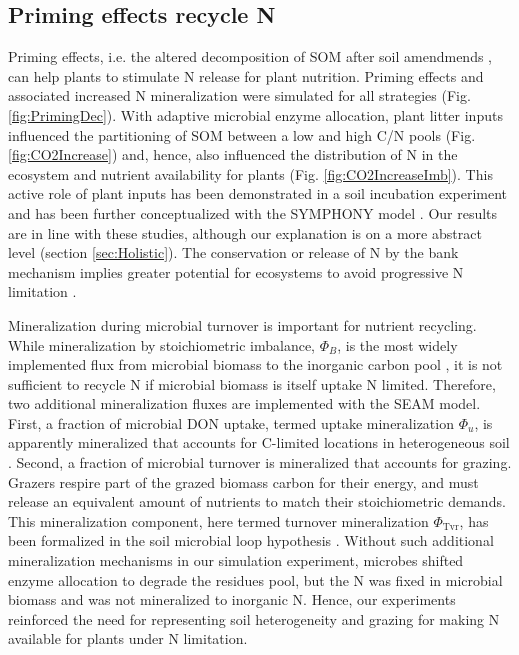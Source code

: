 \subsection{Priming effects recycle N}
Priming effects, i.e. the altered decomposition of SOM after soil amendmends
\citep{Kuzyakov00}, can help plants to stimulate N release for plant nutrition.
Priming effects and associated increased N mineralization were simulated for all
strategies (Fig. \ref{fig:PrimingDec}). With adaptive microbial enzyme
allocation, plant litter inputs influenced the partitioning of SOM between a low
and high C/N pools (Fig. \ref{fig:CO2Increase}) and, hence,
also influenced the distribution of N in the ecosystem and nutrient
availability for plants (Fig. \ref{fig:CO2IncreaseImb}). This active role of
plant inputs has been demonstrated in a soil incubation experiment
\citep{Fontaine11} and has been further conceptualized with the SYMPHONY model
\citep{Perveen14}. Our results are in line with these studies, although our
explanation is on a more abstract level (section \ref{sec:Holistic}). The
conservation or release of N by the bank mechanism implies greater potential
for ecosystems to avoid progressive N limitation \citep{Norby10, Franklin14, Averill15}.

Mineralization during microbial turnover is important for nutrient recycling.
While mineralization by stoichiometric imbalance, $\Phi_B$, is the most widely
implemented flux from microbial biomass to the inorganic carbon pool
\citep{Manzoni09}, it is not sufficient to recycle N if microbial biomass is
itself uptake N limited. Therefore, two additional mineralization fluxes are
implemented with the SEAM model. First, a fraction of microbial DON uptake,
termed uptake mineralization $\Phi_u$, is apparently mineralized that accounts for
C-limited locations in heterogeneous soil \citep{Manzoni08}.
Second, a fraction of microbial turnover is mineralized that accounts for
grazing. Grazers respire part of the grazed biomass carbon for their energy, and
must release an equivalent amount of nutrients to match their stoichiometric
demands. This mineralization component, here termed turnover mineralization
$\Phi_{\operatorname{Tvr}}$, has been formalized in the soil microbial loop
hypothesis \citep{Clarholm85, Raynaud06}. Without such additional mineralization
mechanisms in our simulation experiment, microbes shifted enzyme allocation to
degrade the residues pool, but the N was fixed in microbial biomass and was not
mineralized to inorganic N. Hence, our experiments reinforced the need for
representing soil heterogeneity and grazing for making N available for plants
under N limitation.

